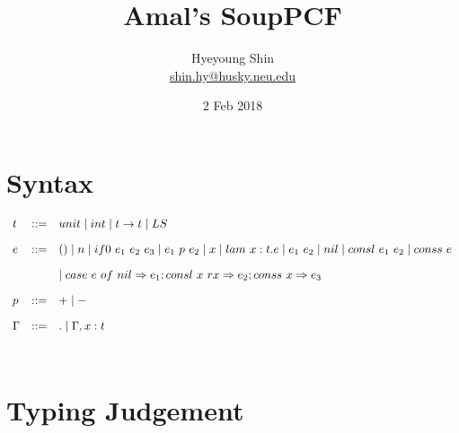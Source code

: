 \documentclass{article}
\title{Amal's SoupPCF}
\author{Hyeyoung Shin\\
  \url{shin.hy@husky.neu.edu}}
\date{2 Feb 2018}
\begin{document}

\maketitle

\section{Syntax}

$\begin{array}{l c l}
  t    & ::= & unit \mid int \mid t \rightarrow t \mid LS\\[1em]
  e    & ::= & () \mid n \mid if0~e_1~e_2~e_3 \mid e_1~p~e_2 \mid x \mid lam~x:t.e \mid e_1~e_2 \mid nil \mid consl~e_1~e_2 \mid conss~e\\[1em]
       &     &  \mid case~e~of~nil \Rightarrow e_1; consl~x~rx \Rightarrow e_2; conss~x \Rightarrow e_3\\[1em]
  p    & ::= & + \mid -\\[1em]
  \Gamma & ::= & . \mid \Gamma,x:t\\[2em]
\end{array}$


\section{Typing Judgement}
\end{document}
